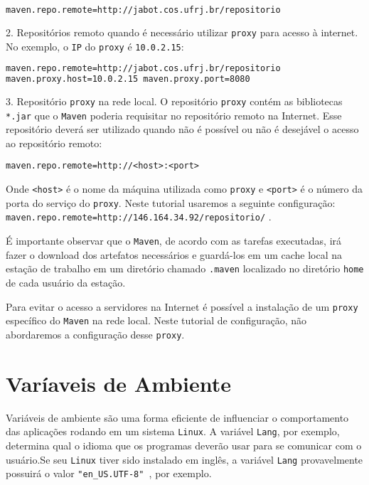 \begin{lstlisting}[language=bash]
maven.repo.remote=http://jabot.cos.ufrj.br/repositorio 
\end{lstlisting}

2. Repositórios remoto quando é necessário utilizar \texttt{proxy} para acesso à
internet. No exemplo, o \texttt{IP} do \texttt{proxy} é \texttt{10.0.2.15}:

\begin{lstlisting}[language=bash]
maven.repo.remote=http://jabot.cos.ufrj.br/repositorio
maven.proxy.host=10.0.2.15 maven.proxy.port=8080 
\end{lstlisting}

3. Repositório \texttt{proxy} na rede local. O repositório \texttt{proxy} contém
as bibliotecas \texttt{*.jar} que o \texttt{Maven} poderia requisitar no
repositório remoto na Internet. Esse repositório deverá ser utilizado quando não
é possível ou não é desejável o acesso ao repositório remoto:

\begin{verbatim}
maven.repo.remote=http://<host>:<port> 
\end{verbatim}

Onde \texttt{<host>} é o nome da máquina utilizada como \texttt{proxy} e
\texttt{<port>} é o número da porta do serviço do \texttt{proxy}. Neste
tutorial usaremos a seguinte configuração:
\texttt{maven.repo.remote=http://146.164.34.92/repositorio/} .

É importante observar que o \texttt{Maven}, de acordo com as tarefas executadas,
irá fazer o download dos artefatos necessários e guardá-los em um cache local na
estação de trabalho em um diretório chamado \texttt{.maven} localizado no
diretório \texttt{home} de cada usuário da estação.

Para evitar o acesso a servidores na Internet é possível a instalação de um
\texttt{proxy} específico do \texttt{Maven} na rede local. Neste tutorial de
configuração, não abordaremos a configuração desse \texttt{proxy}.

\section{Varíaveis de Ambiente}

Variáveis de ambiente são uma forma eficiente de influenciar o comportamento das
aplicações rodando em um sistema \texttt{Linux}. A variável \texttt{Lang}, por
exemplo, determina qual o idioma que os programas deverão usar para se comunicar
com o usuário.Se seu \texttt{Linux} tiver sido instalado em inglês, a variável \texttt{Lang}
provavelmente possuirá o valor \texttt{"en\_US.UTF-8" }, por exemplo.

